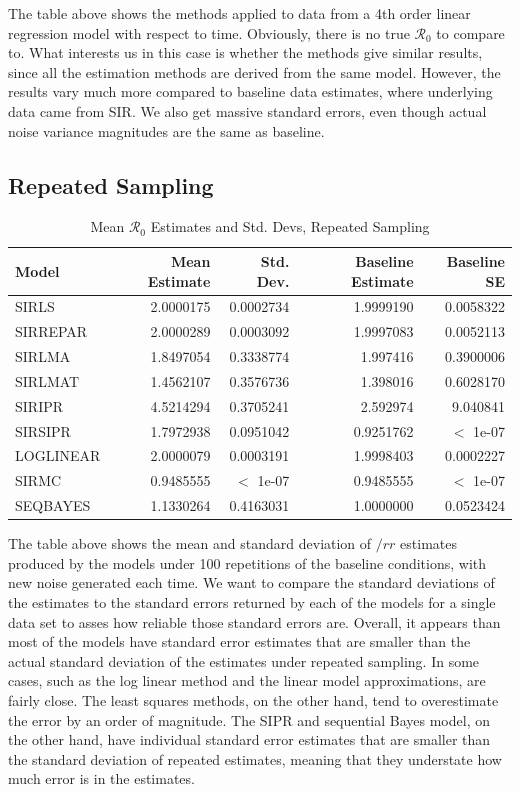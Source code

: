 \documentclass[12pt]{article}
\newcommand{\rr}{\ensuremath{\mathcal{R}_0}}
\begin{document}
The table above shows the methods applied to data from a 4th order linear regression model with respect to time. Obviously, there is no true $\rr$ to compare to. What interests us in this case is whether the methods give similar results, since all the estimation methods are derived from the same model. However, the results vary much more compared to baseline data estimates, where underlying data came from SIR. We also get massive standard errors, even though actual noise variance magnitudes are the same as baseline.

\subsection{Repeated Sampling}

\begin{table}[H]
	
	\caption{\label{tab:}Mean $\rr$ Estimates and Std. Devs, Repeated Sampling}
	\centering
	\begin{tabular}[t]{l|r|r|r|r}
		\hline
		Model & Mean Estimate & Std. Dev. & Baseline Estimate & Baseline SE\\
		\hline
		SIRLS & 2.0000175 & 0.0002734 & 1.9999190 & 0.0058322\\
		\hline
		SIRREPAR & 2.0000289 & 0.0003092 & 1.9997083 & 0.0052113\\
		\hline
		SIRLMA & 1.8497054 & 0.3338774 & 1.997416 & 0.3900006\\
		\hline
		SIRLMAT & 1.4562107 & 0.3576736 & 1.398016 & 0.6028170 \\
		\hline
		SIRIPR & 4.5214294 & 0.3705241 & 2.592974 & 9.040841\\
		\hline
		SIRSIPR & 1.7972938 & 0.0951042 & 0.9251762 & $<$ 1e-07 \\
		\hline
		LOGLINEAR & 2.0000079 & 0.0003191 & 1.9998403 & 0.0002227\\
		\hline
		SIRMC & 0.9485555 & $<$ 1e-07 & 0.9485555 & $<$ 1e-07\\
		\hline
		SEQBAYES & 1.1330264 & 0.4163031 & 1.0000000 & 0.0523424\\
		\hline
	\end{tabular}
\end{table}

The table above shows the mean and standard deviation of $/rr$ estimates produced by the models under 100 repetitions of the baseline conditions, with new noise generated each time. We want to compare the standard deviations of the estimates to the standard errors returned by each of the models for a single data set to asses how reliable those standard errors are. Overall, it appears than most of the models have standard error estimates that are smaller than the actual standard deviation of the estimates under repeated sampling. In some cases, such as the log linear method and the linear model approximations, are fairly close. The least squares methods, on the other hand, tend to overestimate the error by an order of magnitude. The SIPR and sequential Bayes model, on the other hand, have individual standard error estimates that are smaller than the standard deviation of repeated estimates, meaning that they understate how much error is in the estimates.
\end{document}

